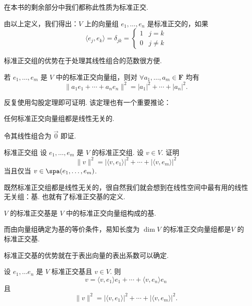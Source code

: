 在本书的剩余部分中我们都称此性质为标准正交.

由以上定义，我们得出：$ V $ 上的向量组 $ e_1, \ldots , e_n $ 是标准正交的，如果
\[ \langle e_j, e_k \rangle = \delta _{jk} = \begin{cases}
        1 & j = k    \\
        0 & j \neq k
    \end{cases} \]

标准正交组的优势在于处理其线性组合的范数很方便.

\begin{theorem}{}{}
    若 $e_1, \ldots , e_m$ 是 $ V $ 中的标准正交向量组，则对 $\forall a_1, \ldots, a_m \in \mathbf{F}$ 均有
    \[ \lVert a_1e_1 + \cdots + a_ne_n\rVert^2 = \lvert a_1 \rvert^2 + \cdots + \lvert a_n \rvert^2.\]
\end{theorem}

反复使用勾股定理即可证明. 该定理也有一个重要推论：

\begin{theorem}{}{}
    任何标准正交向量组都是线性无关的.
\end{theorem}

令其线性组合为 $ \vec{0} $ 即证.

\begin{example}{}{标准正交组}
    设 $e_1, \ldots , e_m$ 是 $ V $ 的标准正交组. 设 $ v \in V $. 证明
    \[ \lVert v \rVert^2 = \lvert \langle v, e_1\rangle \rvert^2 + \cdots + \lvert \langle v, e_m\rangle \rvert^2 \]
    当且仅当 $ v \in \spa(e_1, \ldots , e_m)$.
\end{example}

既然标准正交组都是线性无关的，很自然我们就会想到在线性空间中最有用的线性无关组：基. 也就有了标准正交基的定义.

\begin{definition}{}{}
    $ V $ 的标准正交基是 $ V $ 中的标准正交向量组构成的基.
\end{definition}

而由向量组确定为基的等价条件，易知长度为 $\dim V$ 的标准正交向量组都是$ V $ 的标准正交基.

标准正交基的优势就在于表出向量的表出系数可以确定.

\begin{theorem}{}{}
    设 $e_1, \ldots e_n$ 是 $ V $ 标准正交基且 $ v \in V$. 则
    \begin{equation} \label{eq:23:Fourier展开}
        v = \langle v, e_1 \rangle e_1 + \cdots + \langle v, e_n \rangle e_n
    \end{equation}
    且
    \[ \lVert v \rVert^2 = \lvert \langle v, e_1\rangle \rvert^2 + \cdots + \lvert \langle v, e_m\rangle \rvert^2. \]
\end{theorem}

